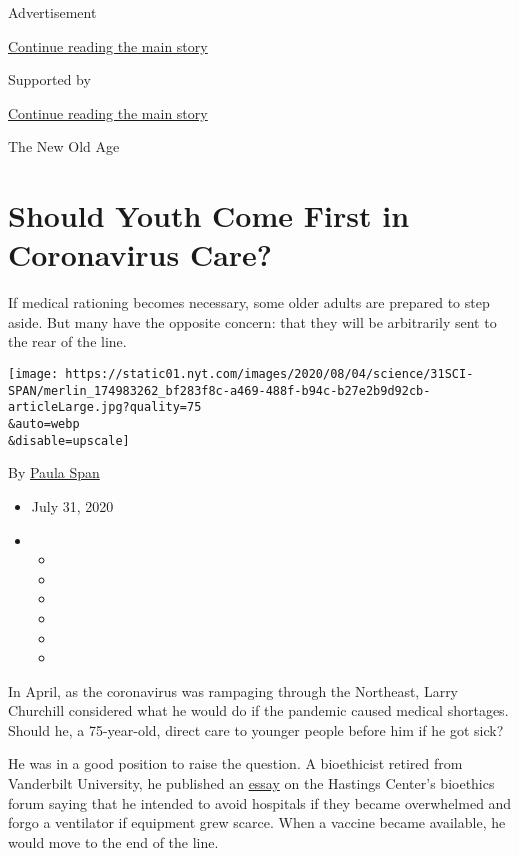 Advertisement

\protect\hyperlink{after-top}{Continue reading the main story}

Supported by

\protect\hyperlink{after-sponsor}{Continue reading the main story}

The New Old Age

\hypertarget{should-youth-come-first-in-coronavirus-care}{%
\section{Should Youth Come First in Coronavirus
Care?}\label{should-youth-come-first-in-coronavirus-care}}

If medical rationing becomes necessary, some older adults are prepared
to step aside. But many have the opposite concern: that they will be
arbitrarily sent to the rear of the line.

\texttt{[image: https://static01.nyt.com/images/2020/08/04/science/31SCI-SPAN/merlin\_174983262\_bf283f8c-a469-488f-b94c-b27e2b9d92cb-articleLarge.jpg?quality=75\\\&auto=webp\\\&disable=upscale]}

By \href{https://www.nytimes.com/by/paula-span}{Paula Span}

\begin{itemize}
\item
  July 31, 2020
\item
  \begin{itemize}
  \item
  \item
  \item
  \item
  \item
  \item
  \end{itemize}
\end{itemize}

In April, as the coronavirus was rampaging through the Northeast, Larry
Churchill considered what he would do if the pandemic caused medical
shortages. Should he, a 75-year-old, direct care to younger people
before him if he got sick?

He was in a good position to raise the question. A bioethicist retired
from Vanderbilt University, he published an
\href{https://www.thehastingscenter.org/on-being-an-elder-in-a-pandemic/}{essay}
on the Hastings Center's bioethics forum saying that he intended to
avoid hospitals if they became overwhelmed and forgo a ventilator if
equipment grew scarce. When a vaccine became available, he would move to
the end of the line.

